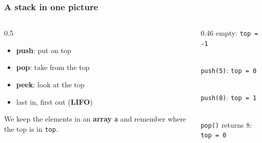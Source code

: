\documentclass[aspectratio=169,10pt,compress]{beamer}
\begin{document}
\begin{frame}[t,fragile] \frametitle{A stack in one picture}
  \begin{columns}[T]
    \begin{column}{0.5\textwidth}
      \begin{itemize}
        \item \textbf{push}: put on top
        \item \textbf{pop}: take from the top
        \item \textbf{peek}: look at the top
        \item last in, first out (\textbf{LIFO})
      \end{itemize}
      \vspace{0.5em}
      We keep the elements in an \textbf{array} \texttt{a} and remember where the top is in \texttt{top}.
    \end{column}
    \begin{column}{0.46\textwidth}
      \small empty: \texttt{top = -1}\\
      \\[0.5em]
      \texttt{push(5)}: \texttt{top = 0}\\
      \\[0.5em]
      \texttt{push(8)}: \texttt{top = 1}\\
      \\[0.5em]
      \texttt{pop()} returns 8: \texttt{top = 0}\\
    \end{column}
  \end{columns}
\end{frame}

\end{document}
